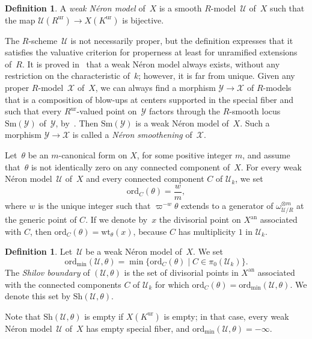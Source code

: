 \documentclass[11pt]{article}
\theoremstyle{definition}
\newtheorem{definition}[equation]{Definition}
\numberwithin{equation}{subsection}
\newcommand{\cX}{\ensuremath{\mathscr{X}}}
\newcommand{\cU}{\ensuremath{\mathscr{U}}}
\newcommand{\cY}{\ensuremath{\mathscr{Y}}}
\newcommand{\an}{\mathrm{an}}
\newcommand{\ord}{\mathrm{ord}}
\newcommand{\ordmin}{\ord_{\min}}
\newcommand{\Sh}{\mathrm{Sh}}
\newcommand{\Sm}{\mathrm{Sm}}
\newcommand{\ur}{\mathrm{ur}}
\newcommand{\wt}{\mathrm{wt}}
\let\form\theta
\let\unif\varpi
\begin{document}
\begin{definition}
A {\em weak Néron model} of~$X$ is a smooth $R$\nobreakdash-model~$\cU$ of~$X$ such that the map $\cU(R^{\ur})\to X(K^{\ur})$ is bijective.
\end{definition}

The $R$\nobreakdash-scheme~$\cU$ is not necessarily proper, but the definition expresses that it satisfies the valuative criterion for properness at least for unramified extensions of~$R$. It is proved in~\cite{BLR} that a weak Néron model always exists, without any restriction on the characteristic of~$k$; however, it is far from unique. Given any proper $R$\nobreakdash-model~$\cX$ of~$X$, we can always find a morphism $\cY\to \cX$ of $R$\nobreakdash-models that is a composition of blow-ups at centers supported in the special fiber and such that every $R^{\ur}$-valued point on~$\cY$ factors through the $R$\nobreakdash-smooth locus $\Sm(\cY)$ of~$\cY$, by~\cite[3.4/2]{BLR}. Then $\Sm(\cY)$ is a weak Néron model of~$X$. Such a morphism $\cY\to \cX$ is called a {\em Néron smoothening} of~$\cX$.

Let~$\form$ be an $m$-canonical form on $X$, for some positive integer $m$, and assume that~$\form$ is not identically zero on any connected component of~$X$.
For every weak Néron model~$\cU$ of~$X$ and every connected component $C$ of $\cU_k$, we set
\[
\ord_C(\form)=\frac{w}{m},
\]
where $w$ is the unique integer such that $\unif^{-w} \form$ extends to a generator of $\omega^{\otimes m}_{\cU/R}$ at the generic point of $C$.
If we denote by~$x$ the divisorial point on $X^{\an}$ associated with $C$, then $\ord_C(\form)=\wt_{\form}(x)$, because $C$ has multiplicity $1$ in $\cU_k$.

\begin{definition}\label{defi:shilov}
Let~$\cU$ be a weak Néron model of~$X$. We set
\[
\ordmin(\cU,\form)=\min\{\ord_C(\form)\mid C\in \pi_0(\cU_k)\}.
\]
The {\em Shilov boundary} of $(\cU,\form)$ is the set of divisorial points in $X^{\an}$ associated with the connected components $C$ of $\cU_k$ for which $\ord_C(\form)=\ordmin(\cU,\form)$. We denote this set by $\Sh(\cU,\form)$.
\end{definition}
Note that $\Sh(\cU,\form)$ is empty if $X(K^{\ur})$ is empty; in that case, every weak Néron model~$\cU$ of~$X$ has empty special fiber, and $\ordmin(\cU,\form)=-\infty$.
\end{document}
